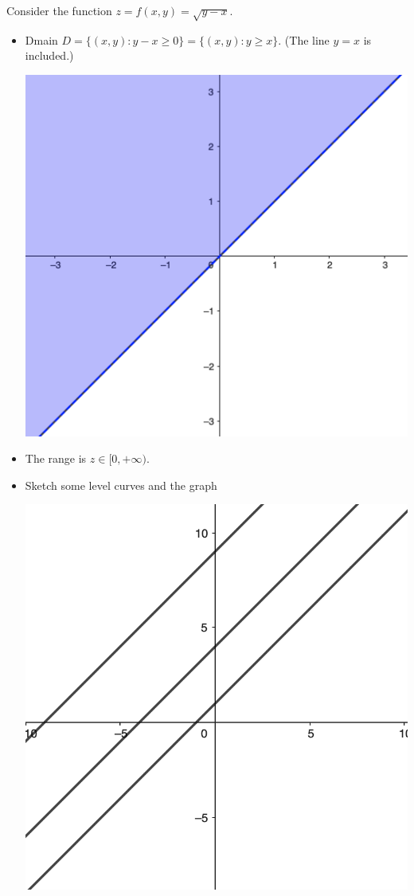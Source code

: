 \begin{example} Consider the function $z=f(x,y) = \sqrt{y-x}$.
    \begin{itemize}
        \item[(a)] Dmain $D = \{(x,y): y-x\geq 0\}=\{(x,y): y\geq x\}$. (The line $y=x$ is included.)
        \begin{center}
            \includegraphics[scale=0.3]{images/11-ex4-a.png}
        \end{center}
        \item[(b)] The range is $z\in [0,+\infty)$.
        \item[(c)] Sketch some level curves and the graph
        \begin{center}
            \includegraphics[scale=0.4]{images/11-ex4-b.png}\quad 

\end{center}
\end{itemize}
\end{example}
